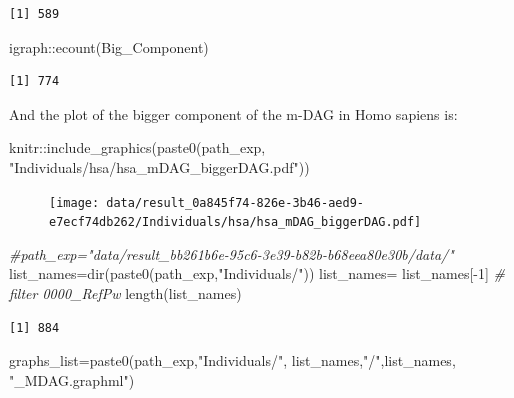 \documentclass[
  letterpaper,
  DIV=11,
  numbers=noendperiod]{scrreprt}
\newenvironment{Shaded}{}{}
\newcommand{\CommentTok}[1]{\textcolor[rgb]{0.36,0.39,0.44}{\textit{#1}}}
\newcommand{\DecValTok}[1]{\textcolor[rgb]{0.82,0.60,0.40}{#1}}
\newcommand{\FunctionTok}[1]{\textcolor[rgb]{0.38,0.69,0.94}{#1}}
\newcommand{\NormalTok}[1]{\textcolor[rgb]{0.67,0.70,0.75}{#1}}
\newcommand{\OtherTok}[1]{\textcolor[rgb]{0.15,0.68,0.38}{#1}}
\newcommand{\SpecialCharTok}[1]{\textcolor[rgb]{0.34,0.71,0.76}{#1}}
\newcommand{\StringTok}[1]{\textcolor[rgb]{0.60,0.76,0.47}{#1}}
\begin{document}
\begin{verbatim}
[1] 589
\end{verbatim}

\begin{Shaded}
\begin{Highlighting}[]
\NormalTok{igraph}\SpecialCharTok{::}\FunctionTok{ecount}\NormalTok{(Big\_Component)}
\end{Highlighting}
\end{Shaded}

\begin{verbatim}
[1] 774
\end{verbatim}

And the plot of the bigger component of the m-DAG in Homo sapiens is:

\begin{Shaded}
\begin{Highlighting}[]
\NormalTok{knitr}\SpecialCharTok{::}\FunctionTok{include\_graphics}\NormalTok{(}\FunctionTok{paste0}\NormalTok{(path\_exp,}
                               \StringTok{"Individuals/hsa/hsa\_mDAG\_biggerDAG.pdf"}\NormalTok{))}
\end{Highlighting}
\end{Shaded}

\begin{figure}[H]

{\centering \texttt{[image: data/result\_0a845f74-826e-3b46-aed9-e7ecf74db262/Individuals/hsa/hsa\_mDAG\_biggerDAG.pdf]}

}

\end{figure}

\begin{Shaded}
\begin{Highlighting}[]
\CommentTok{\#path\_exp="data/result\_bb261b6e{-}95c6{-}3e39{-}b82b{-}b68eea80e30b/data/" }
\NormalTok{list\_names}\OtherTok{=}\FunctionTok{dir}\NormalTok{(}\FunctionTok{paste0}\NormalTok{(path\_exp,}\StringTok{"Individuals/"}\NormalTok{))}
\NormalTok{list\_names}\OtherTok{=}\NormalTok{ list\_names[}\SpecialCharTok{{-}}\DecValTok{1}\NormalTok{] }\CommentTok{\# filter 0000\_RefPw}
\FunctionTok{length}\NormalTok{(list\_names) }
\end{Highlighting}
\end{Shaded}

\begin{verbatim}
[1] 884
\end{verbatim}

\begin{Shaded}
\begin{Highlighting}[]
\NormalTok{graphs\_list}\OtherTok{=}\FunctionTok{paste0}\NormalTok{(path\_exp,}\StringTok{"Individuals/"}\NormalTok{, list\_names,}\StringTok{"/"}\NormalTok{,list\_names, }\StringTok{"\_MDAG.graphml"}\NormalTok{)}
\end{Highlighting}
\end{Shaded}
\end{document}
